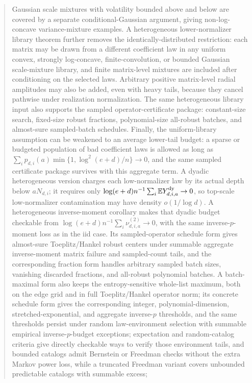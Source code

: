 \documentclass[11pt]{amsart}
\numberwithin{equation}{section}
\theoremstyle{definition}
\theoremstyle{remark}
\newcommand{\Exp}{\mathbb E}
\begin{document}
\begin{abstract}
Gaussian scale mixtures with volatility bounded above and below are covered by a
separate conditional-Gaussian argument, giving non-log-concave variance-mixture
examples.  A
heterogeneous lower-normalizer library theorem further removes the
identically-distributed restriction: each matrix may be drawn from a different
coefficient law in any uniform convex, strongly log-concave, finite-convolution,
or bounded Gaussian scale-mixture library, and finite matrix-level mixtures are
included after conditioning on the selected laws.  Arbitrary positive
matrix-level radial amplitudes may also be added, even with heavy tails, because
they cancel pathwise under realization normalization.  The same heterogeneous
library input also supports the sampled
operator-certificate package: constant-size search, fixed-size robust fractions,
polynomial-size all-robust batches, and almost-sure sampled-batch schedules.
Finally, the uniform-library assumption can be weakened to an average
lower-tail budget: a sparse or budgeted population of bad coefficient laws is
allowed as long as
\(\sum_i p_{d,i}(a)\min\{1,\log^2(e+d)/n\}\to0\), and the same sampled
certificate package survives with this aggregate term.  A dyadic heterogeneous
version charges each low-normalizer law by its actual depth below \(aN_{d,i}\);
it requires only
\(\log(e+d)n^{-1}\sum_i\Exp Y_{d,i,a}^{\rm dy}\to0\), so top-scale
low-normalizer contamination may have density \(o(1/\log d)\).  A
heterogeneous inverse-moment corollary makes that dyadic budget checkable from
\(\log(e+d)n^{-1}\sum_i\nu_{d,i,a}^{(2)}\to0\), with the same
inverse-\(p\)-moment loss as in the iid case.  Its sampled-operator schedule
form gives almost-sure Toeplitz/Hankel robust centers under summable aggregate
inverse-moment matrix failure and sampled-count tails, and the corresponding
fraction form handles arbitrary sampled batch sizes, vanishing discarded
fractions, and all-robust polynomial batches.  A batch-maximal form also keeps
the entropy-sensitive whole-list maximum, both on the edge grid and in full
Toeplitz/Hankel operator norm; its concrete schedule form gives the
corresponding integer, polynomial-dimension, stretched-exponential, and
aggregate inverse-\(p\) thresholds, and the same thresholds persist under
random law-environment selection with summable empirical inverse-\(p\)-budget
exceptions; expectation and random-catalog criteria give directly checkable
ways to verify those environment tails, and bounded catalogs admit Bernstein or
Freedman checks without the extra Markov power loss, while a truncated
Freedman variant covers unbounded predictable catalogs with summable excess;

\end{abstract}
\end{document}
